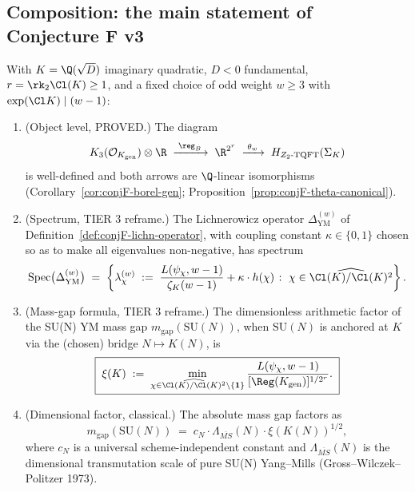 \subsection{Composition: the main statement of Conjecture F v3}
\label{sec:conjF-composition}

\begin{conjecture}
\label{conj:conjF-v3}
With $K = \Q(\sqrt D)$ imaginary quadratic, $D < 0$ fundamental,
$r = \rk_2 \Cl(K) \ge 1$, and a fixed choice of odd weight
$w \ge 3$ with $\exp(\Cl K) \mid (w-1)$:
\begin{enumerate}[label=\textup{(\Alph*)},leftmargin=*]
\item {\rm (Object level, PROVED.)}
   The diagram
   \[
   K_3(\mathcal{O}_{K_{\mathrm{gen}}}) \otimes \R
   \;\xrightarrow{\;\reg_B\;}\;
   \R^{2^r}
   \;\xrightarrow{\;\theta_w\;}\;
   H_{Z_2\text{-}\mathrm{TQFT}}(\Sigma_K)
   \]
   is well-defined and both arrows are $\Q$-linear isomorphisms
   (Corollary~\ref{cor:conjF-borel-gen};
   Proposition~\ref{prop:conjF-theta-canonical}).
\item {\rm (Spectrum, TIER 3 reframe.)}
   The Lichnerowicz operator $\Delta_{\mathrm{YM}}^{(w)}$ of
   Definition~\ref{def:conjF-lichn-operator}, with coupling
   constant $\kappa \in \{0, 1\}$ chosen so as to make all
   eigenvalues non-negative, has spectrum
   \begin{equation}\label{eq:conjF-spectrum}
   \mathrm{Spec}\bigl(\Delta_{\mathrm{YM}}^{(w)}\bigr) \;=\;
   \left\{
   \lambda_\chi^{(w)} \;:=\;
   \frac{L(\psi_\chi, w-1)}{\zeta_K(w-1)} + \kappa \cdot h(\chi)
   \;\colon\; \chi \in \widehat{\Cl(K)/\Cl(K)^2}
   \right\}.
   \end{equation}
\item {\rm (Mass-gap formula, TIER 3 reframe.)}
   The dimensionless arithmetic factor of the SU(N) YM mass gap
   $m_{\mathrm{gap}}(\mathrm{SU}(N))$, when $\mathrm{SU}(N)$ is
   anchored at $K$ via the (chosen) bridge $N \mapsto K(N)$, is
   \begin{equation}\label{eq:conjF-mgap-final}
   \boxed{\;
   \xi(K) \;:=\;
   \min_{\chi \in \widehat{\Cl(K)/\Cl(K)^2} \setminus \{\mathbf{1}\}}
   \frac{L(\psi_\chi, w-1)}{[\Reg(K_{\mathrm{gen}})]^{1/2^r}}.
   \;}
   \end{equation}
\item {\rm (Dimensional factor, classical.)}
   The absolute mass gap factors as
   \[
   m_{\mathrm{gap}}(\mathrm{SU}(N)) \;=\;
   c_N \cdot \Lambda_{\overline{MS}}(N) \cdot \xi(K(N))^{1/2},
   \]
   where $c_N$ is a universal scheme-independent constant and
   $\Lambda_{\overline{MS}}(N)$ is the dimensional transmutation
   scale of pure SU(N) Yang--Mills (Gross--Wilczek--Politzer 1973).
\end{enumerate}
\end{conjecture}

